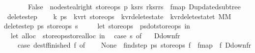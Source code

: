 \begin{isabellebody}
\ \ \ \ \ \ {\isacharbar}\ False\ {\isasymRightarrow}\ node{\isacharunderscore}steal{\isacharunderscore}right\ store{\isacharunderscore}ops\ p\ {\isacharparenleft}ks{\isacharcomma}rs{\isacharparenright}\ {\isacharparenleft}r{\isacharunderscore}ks{\isacharcomma}r{\isacharunderscore}rs{\isacharparenright}\ {\isacharbar}{\isachargreater}\ fmap\ D{\isacharunderscore}updated{\isacharunderscore}subtree{\isacharparenright}{\isacharparenright}{\isacharparenright}{\isacharparenright}{\isacharparenright}{\isacharparenright}{\isachardoublequoteclose}\isanewline
\isanewline
\isanewline
{}\isamarkupfalse%
\ delete{\isacharunderscore}step\ {\isacharcolon}{\isacharcolon}\ \isanewline
\ \ {\isachardoublequoteopen}{\isacharprime}k\ ps{}\ {\isasymRightarrow}\ {\isacharparenleft}{\isacharprime}k{\isacharcomma}{\isacharprime}v{\isacharcomma}{\isacharprime}r{\isacharcomma}{\isacharprime}t{\isacharparenright}\ store{\isacharunderscore}ops\ {\isasymRightarrow}\ {\isacharparenleft}{\isacharprime}k{\isacharcomma}{\isacharprime}v{\isacharcomma}{\isacharprime}r{\isacharparenright}delete{\isacharunderscore}state\ {\isasymRightarrow}\ {\isacharparenleft}{\isacharparenleft}{\isacharprime}k{\isacharcomma}{\isacharprime}v{\isacharcomma}{\isacharprime}r{\isacharparenright}delete{\isacharunderscore}state{\isacharcomma}{\isacharprime}t{\isacharparenright}\ MM{\isachardoublequoteclose}\ \isanewline
{}\isanewline
{\isachardoublequoteopen}delete{\isacharunderscore}step\ ps{}\ store{\isacharunderscore}ops\ s\ {\isacharequal}\ {\isacharparenleft}\isanewline
\ \ {\isacharparenleft}{\isacharasterisk}\ let\ store{\isacharunderscore}ops\ {\isacharequal}\ ps{}{\isacharbar}{\isachargreater}dot{\isacharunderscore}store{\isacharunderscore}ops\ in\ {\isacharasterisk}{\isacharparenright}\isanewline
\ \ let\ alloc\ {\isacharequal}\ store{\isacharunderscore}ops{\isacharbar}{\isachargreater}store{\isacharunderscore}alloc\ in\isanewline
\ \ case\ s\ of\ \isanewline
\ \ D{\isacharunderscore}down{\isacharparenleft}f{\isacharcomma}r{}{\isacharparenright}\ {\isasymRightarrow}\ {\isacharparenleft}\isanewline
\ \ \ \ case\ {\isacharparenleft}dest{\isacharunderscore}f{\isacharunderscore}finished\ f{\isacharparenright}\ of\isanewline
\ \ \ \ None\ {\isasymRightarrow}\ {\isacharparenleft}find{\isacharunderscore}step\ ps{}\ store{\isacharunderscore}ops\ f\ {\isacharbar}{\isachargreater}\ fmap\ {\isacharparenleft}{\isacharpercent}\ f{\isacharprime}{\isachardot}\ D{\isacharunderscore}down{\isacharparenleft}f{\isacharprime}{\isacharcomma}r{}{\isacharparenright}{\isacharparenright}{\isacharparenright}\isanewline

\end{isabellebody}
